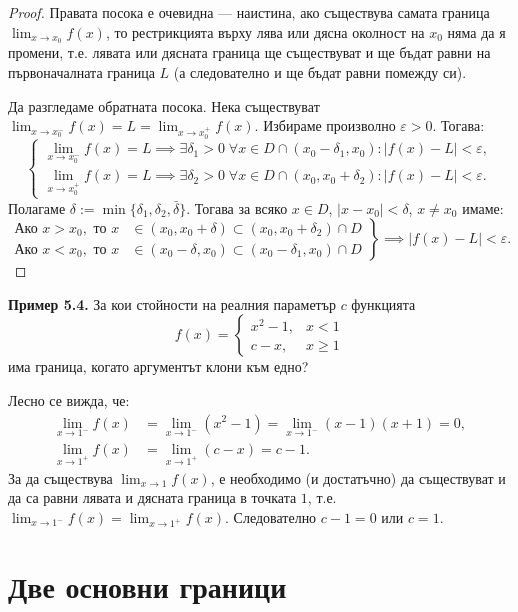 \begin{proof}
Правата посока е очевидна — наистина, ако съществува самата граница $\lim_{x \to x_0} f(x)$, то рестрикцията върху лява или дясна околност на $x_0$ няма да я промени, т.е. лявата или дясната граница ще съществуват и ще бъдат равни на първоначалната граница $L$ (а следователно и ще бъдат равни помежду си).

Да разгледаме обратната посока. Нека съществуват $\lim_{x \to x_0^-} f(x) = L = \lim_{x \to x_0^+} f(x)$. Избираме произволно $\varepsilon > 0$. Тогава:
\[
\begin{cases}
\lim_{x \to x_0^-} f(x) = L \implies \exists \delta_1 > 0 \; \forall x \in D \cap (x_0 - \delta_1, x_0) : |f(x) - L| < \varepsilon, \\
\lim_{x \to x_0^+} f(x) = L \implies \exists \delta_2 > 0 \; \forall x \in D \cap (x_0, x_0 + \delta_2) : |f(x) - L| < \varepsilon.
\end{cases}
\]
Полагаме $\delta := \min\{\delta_1, \delta_2, \bar{\delta}\}$. Тогава за всяко $x \in D$, $|x - x_0| < \delta$, $x \neq x_0$ имаме:
\[
\left.
\begin{aligned}
\text{Ако } x > x_0, \text{ то } x &\in (x_0, x_0 + \delta) \subset (x_0, x_0 + \delta_2) \cap D \\
\text{Ако } x < x_0, \text{ то } x &\in (x_0 - \delta, x_0) \subset (x_0 - \delta_1, x_0) \cap D
\end{aligned}
\right\} \implies |f(x) - L| < \varepsilon.
\]
\end{proof}

\noindent\textbf{Пример 5.4.} За кои стойности на реалния параметър $c$ функцията
\[
f(x) = \begin{cases}
x^2 - 1, & x < 1 \\
c - x, & x \ge 1
\end{cases}
\]
има граница, когато аргументът клони към едно?

Лесно се вижда, че:
\begin{align*}
\lim_{x \to 1^-} f(x) &= \lim_{x \to 1^-} (x^2 - 1) = \lim_{x \to 1^-} (x - 1)(x + 1) = 0, \\
\lim_{x \to 1^+} f(x) &= \lim_{x \to 1^+} (c - x) = c - 1.
\end{align*}
За да съществува $\lim_{x \to 1} f(x)$, е необходимо (и достатъчно) да съществуват и да са равни лявата и дясната граница в точката $1$, т.е. $\lim_{x \to 1^-} f(x) = \lim_{x \to 1^+} f(x)$. Следователно $c - 1 = 0$ или $c = 1$.

\section{Две основни граници}

